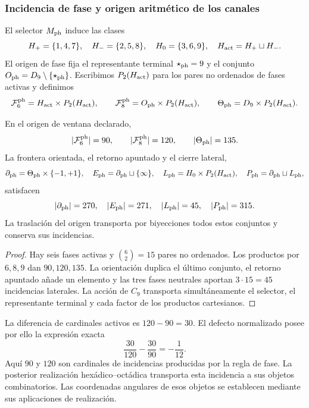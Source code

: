 \subsubsection{Incidencia de fase y origen aritmético de los canales}

El selector \(M_{\rm ph}\) induce las clases
\[
 H_+=\{1,4,7\},\quad H_-=\{2,5,8\},\quad
 H_0=\{3,6,9\},\quad H_{\rm act}=H_+\sqcup H_-.
\]
El origen de fase fija el representante terminal
\(\star_{\rm ph}=9\) y el conjunto
\(O_{\rm ph}=D_9\setminus\{\star_{\rm ph}\}\).
Escribimos \(P_2(H_{\rm act})\) para los pares no ordenados de fases
activas y definimos
\[
 \mathcal F_6^{\rm ph}=H_{\rm act}\times P_2(H_{\rm act}),\qquad
 \mathcal F_8^{\rm ph}=O_{\rm ph}\times P_2(H_{\rm act}),\qquad
 \Theta_{\rm ph}=D_9\times P_2(H_{\rm act}).
\]

\begin{theorem}
\label{ii:ii:tpk-semicorona}
En el origen de ventana declarado,
\[
 |\mathcal F_6^{\rm ph}|=90,\qquad
 |\mathcal F_8^{\rm ph}|=120,\qquad
 |\Theta_{\rm ph}|=135.
\]
La frontera orientada, el retorno apuntado y el cierre lateral,
\[
 \partial_{\rm ph}=\Theta_{\rm ph}\times\{-1,+1\},\quad
 E_{\rm ph}=\partial_{\rm ph}\sqcup\{\infty\},\quad
 L_{\rm ph}=H_0\times P_2(H_{\rm act}),\quad
 P_{\rm ph}=\partial_{\rm ph}\sqcup L_{\rm ph},
\]
satisfacen
\[
 |\partial_{\rm ph}|=270,\quad |E_{\rm ph}|=271,\quad
 |L_{\rm ph}|=45,\quad |P_{\rm ph}|=315.
\]
La traslación del origen transporta por biyecciones todos estos conjuntos
y conserva sus incidencias.
\end{theorem}
\begin{proof}
Hay seis fases activas y \(\binom62=15\) pares no ordenados.
Los productos por \(6,8,9\) dan \(90,120,135\). La orientación
duplica el último conjunto, el retorno apuntado añade un elemento y las
tres fases neutrales aportan \(3\cdot15=45\) incidencias laterales.
La acción de \(C_9\) transporta simultáneamente el selector, el
representante terminal y cada factor de los productos cartesianos.
\end{proof}

La diferencia de cardinales activos es \(120-90=30\). El defecto
normalizado posee por ello la expresión exacta
\begin{equation}
 \frac{30}{120}-\frac{30}{90}=-\frac1{12}.
 \label{ii:ii:tpk-defecto-incidencia}
\end{equation}
Aquí \(90\) y \(120\) son cardinales de incidencias producidas por la
regla de fase. La posterior realización hexádico--octádica transporta esta
incidencia a sus objetos combinatorios. Las coordenadas angulares de esos
objetos se establecen mediante sus aplicaciones de realización.

